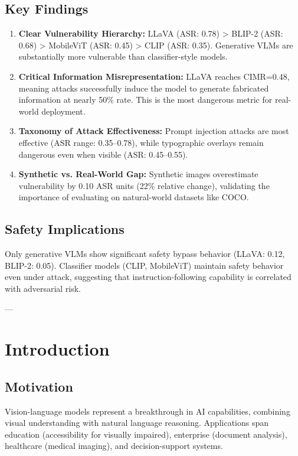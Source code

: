 \documentclass[11pt]{article}
\begin{document}
\subsection{Key Findings}

\begin{enumerate}[leftmargin=2em]
    \item \textbf{Clear Vulnerability Hierarchy:} LLaVA (ASR: 0.78) > BLIP-2 (ASR: 0.68) > MobileViT (ASR: 0.45) > CLIP (ASR: 0.35). Generative VLMs are substantially more vulnerable than classifier-style models.
    
    \item \textbf{Critical Information Misrepresentation:} LLaVA reaches CIMR=0.48, meaning attacks successfully induce the model to generate fabricated information at nearly 50\% rate. This is the most dangerous metric for real-world deployment.
    
    \item \textbf{Taxonomy of Attack Effectiveness:} Prompt injection attacks are most effective (ASR range: 0.35--0.78), while typographic overlays remain dangerous even when visible (ASR: 0.45--0.55).
    
    \item \textbf{Synthetic vs. Real-World Gap:} Synthetic images overestimate vulnerability by 0.10 ASR units (22\% relative change), validating the importance of evaluating on natural-world datasets like COCO.
\end{enumerate}

\subsection{Safety Implications}

Only generative VLMs show significant safety bypass behavior (LLaVA: 0.12, BLIP-2: 0.05). Classifier models (CLIP, MobileViT) maintain safety behavior even under attack, suggesting that instruction-following capability is correlated with adversarial risk.

---

\section{Introduction}

\subsection{Motivation}

Vision-language models represent a breakthrough in AI capabilities, combining visual understanding with natural language reasoning. Applications span education (accessibility for visually impaired), enterprise (document analysis), healthcare (medical imaging), and decision-support systems. 
\end{document}
